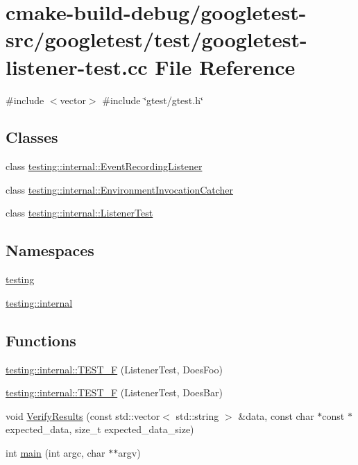 \hypertarget{googletest-listener-test_8cc}{}\section{cmake-\/build-\/debug/googletest-\/src/googletest/test/googletest-\/listener-\/test.cc File Reference}
\label{googletest-listener-test_8cc}
{\ttfamily \#include $<$vector$>$}\newline
{\ttfamily \#include \char`\"{}gtest/gtest.\+h\char`\"{}}\newline
\subsection*{Classes}
\begin{DoxyCompactItemize}
\item 
class \mbox{\hyperlink{classtesting_1_1internal_1_1EventRecordingListener}{testing\+::internal\+::\+Event\+Recording\+Listener}}
\item 
class \mbox{\hyperlink{classtesting_1_1internal_1_1EnvironmentInvocationCatcher}{testing\+::internal\+::\+Environment\+Invocation\+Catcher}}
\item 
class \mbox{\hyperlink{classtesting_1_1internal_1_1ListenerTest}{testing\+::internal\+::\+Listener\+Test}}
\end{DoxyCompactItemize}
\subsection*{Namespaces}
\begin{DoxyCompactItemize}
\item 
 \mbox{\hyperlink{namespacetesting}{testing}}
\item 
 \mbox{\hyperlink{namespacetesting_1_1internal}{testing\+::internal}}
\end{DoxyCompactItemize}
\subsection*{Functions}
\begin{DoxyCompactItemize}
\item 
\mbox{\hyperlink{namespacetesting_1_1internal_a7e113e9c70d45d89fe1703e58ff083b9}{testing\+::internal\+::\+T\+E\+S\+T\+\_\+F}} (Listener\+Test, Does\+Foo)
\item 
\mbox{\hyperlink{namespacetesting_1_1internal_a02cef32090020d164460dd3d9f8e2852}{testing\+::internal\+::\+T\+E\+S\+T\+\_\+F}} (Listener\+Test, Does\+Bar)
\item 
void \mbox{\hyperlink{googletest-listener-test_8cc_ab9d583cd17d35925ad3d12f864d57fe9}{Verify\+Results}} (const std\+::vector$<$ std\+::string $>$ \&data, const char $\ast$const $\ast$expected\+\_\+data, size\+\_\+t expected\+\_\+data\+\_\+size)
\item 
int \mbox{\hyperlink{googletest-listener-test_8cc_a3c04138a5bfe5d72780bb7e82a18e627}{main}} (int argc, char $\ast$$\ast$argv)
\end{DoxyCompactItemize}

